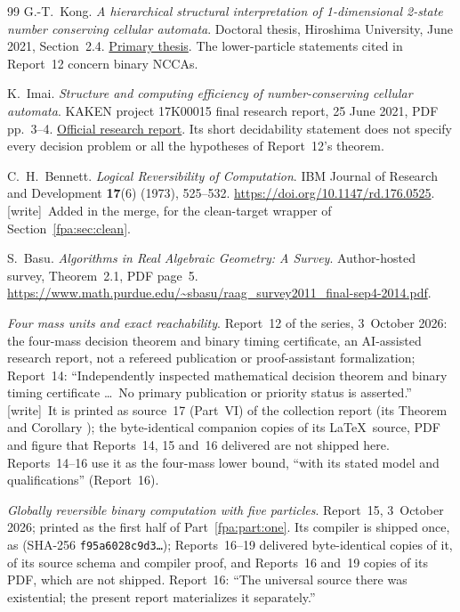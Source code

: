 \documentclass[11pt,a4paper]{article}
\numberwithin{equation}{section}
\newcommand{\wtag}{\textup{[write]}}
\begin{document}
\begin{thebibliography}{99}
G.-T.~Kong. \emph{A hierarchical structural interpretation of 1-dimensional 2-state number conserving cellular automata}. Doctoral thesis, Hiroshima University, June 2021, Section~2.4. \href{https://hiroshima.repo.nii.ac.jp/record/2002360/files/k8621_3.pdf}{Primary thesis}. The lower-particle statements cited in Report~12 concern binary NCCAs.

K.~Imai. \emph{Structure and computing efficiency of number-conserving cellular automata}. KAKEN project 17K00015 final research report, 25 June 2021, PDF pp.~3--4. \href{https://kaken.nii.ac.jp/file/KAKENHI-PROJECT-17K00015/17K00015seika.pdf}{Official research report}. Its short decidability statement does not specify every decision problem or all the hypotheses of Report~12's theorem.

C.~H.~Bennett. \emph{Logical Reversibility of Computation}. IBM Journal of Research and Development \textbf{17}(6) (1973), 525--532. \url{https://doi.org/10.1147/rd.176.0525}. \wtag\ Added in the merge, for the clean-target wrapper of Section~\ref{fpa:sec:clean}.

S.~Basu. \emph{Algorithms in Real Algebraic Geometry: A Survey}. Author-hosted survey, Theorem~2.1, PDF page~5. \url{https://www.math.purdue.edu/~sbasu/raag_survey2011_final-sep4-2014.pdf}.

\emph{Four mass units and exact reachability}. Report~12 of the series, 3~October 2026: the four-mass decision theorem and binary timing certificate, an AI-assisted research report, not a refereed publication or proof-assistant formalization; Report~14: ``Independently inspected mathematical decision theorem and binary timing certificate \dots\ No primary publication or priority status is asserted.'' \wtag\ It is printed as source~17 (Part~VI) of the collection report  (its Theorem  and Corollary ); the byte-identical companion copies of its \LaTeX\ source, PDF and figure that Reports~14, 15 and~16 delivered are not shipped here. Reports~14--16 use it as the four-mass lower bound, ``with its stated model and qualifications'' (Report~16).

\emph{Globally reversible binary computation with five particles}. Report~15, 3~October 2026; printed as the first half of Part~\ref{fpa:part:one}. Its compiler is shipped once, as  (SHA-256 \texttt{f95a6028c9d3\ldots}); Reports~16--19 delivered byte-identical copies of it, of its source schema and compiler proof, and Reports~16 and~19 copies of its PDF, which are not shipped. Report~16: ``The universal source there was existential; the present report materializes it separately.''


\end{thebibliography}
\end{document}
